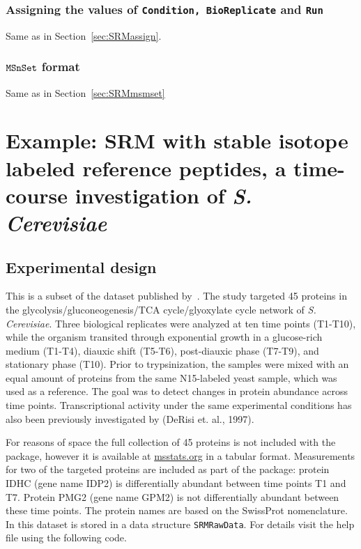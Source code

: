 \documentclass[11pt]{article}
\def\secref#1{Section~\ref{sec:#1}}
\begin{document}
\subsubsection{ Assigning the values of {\tt Condition, BioReplicate} and {\tt Run}}

Same as in \secref{SRMassign}.

\subsubsection{$\tt{MSnSet}$ format } 

Same as in \secref{SRMmsmset}




\clearpage
\section{Example: SRM with stable isotope labeled reference peptides, a time-course investigation of {\it S. Cerevisiae}}


\subsection{Experimental design}
This is a subset of the dataset published by~\cite{Picotti09}. The study targeted 45 proteins in the glycolysis/gluconeogenesis/TCA cycle/glyoxylate cycle network of {\it S. Cerevisiae}. Three biological replicates were analyzed at ten time points (T1-T10), while the organism transited through exponential growth in a glucose-rich medium (T1-T4), diauxic shift (T5-T6), post-diauxic phase (T7-T9), and stationary phase (T10). Prior to trypsinization, the samples were mixed with an equal amount of proteins from the same N15-labeled yeast sample, which was used as a reference. The goal was to detect changes in protein abundance across time points. Transcriptional activity under the same experimental conditions has also been previously investigated by (DeRisi et. al., 1997). 

For reasons of space the full collection of 45 proteins is not included with the package, however it is available at \url{msstats.org} in a tabular format. Measurements for two of the targeted proteins are included as part of the package: protein IDHC (gene name IDP2) is differentially abundant between time points T1 and T7. Protein PMG2 (gene name GPM2) is not differentially abundant between these time points. The protein names are based on the SwissProt nomenclature. In \m this dataset is stored in a data structure {\tt SRMRawData}. For details visit the help file using the following code.
\end{document}
